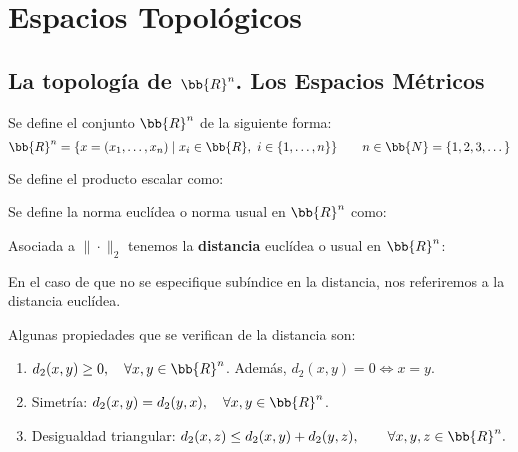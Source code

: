 \chapter{Espacios Topológicos}

\section{La topología de $\bb{R}^n$. Los Espacios Métricos}
\begin{definicion}
    Se define el conjunto $\bb{R}^n$ de la siguiente forma:
    \begin{equation*}
        \bb{R}^n = \{x=(x_1,\dots,x_n)\mid x_i\in \bb{R},~i\in \{1,\dots,n\}\}\qquad n\in \bb{N}=\{1,2,3,\dots\}
    \end{equation*}
\end{definicion}

\begin{definicion}
    Se define el producto escalar como:
\end{definicion}

\begin{definicion}
    Se define la norma euclídea o norma usual en $\bb{R}^n$ como:
\end{definicion}

Asociada a $\|\cdot\|_2$ tenemos la \textbf{distancia} euclídea o usual en $\bb{R}^n$:

\begin{notacion}
    En el caso de que no se especifique subíndice en la distancia, nos referiremos a la distancia euclídea.
\end{notacion}

Algunas propiedades que se verifican de la distancia son:
\begin{enumerate}
    \item $d_2(x,y)\geq 0, \quad \forall x,y\in \bb{R}^n$. Además, $d_2(x,y)=0\Longleftrightarrow x=y$.

    \item Simetría: $d_2(x,y)=d_2(y,x),\quad \forall x,y\in \bb{R}^n$.

    \item Desigualdad triangular: $d_2(x,z)\leq d_2(x,y)+d_2(y,z), \quad \quad \forall x,y,z\in \bb{R}^n.$
\end{enumerate}

